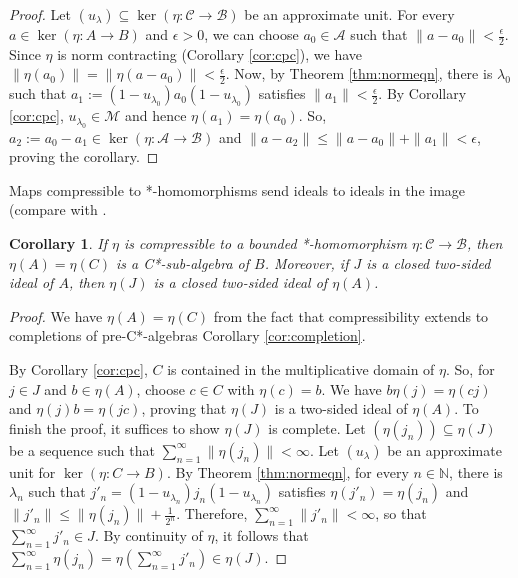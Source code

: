 \documentclass[a4paper, 12pt]{amsart}
\newtheorem{cor}[thm]{Corollary}
\theoremstyle{definition}
\theoremstyle{remark}
\numberwithin{equation}{section}
\begin{document}
\begin{proof}
    Let $(u_{\lambda})\subseteq \ker(\eta:\mathcal{C}\to\mathcal{B})$ be an approximate unit. For every $a\in \ker(\eta:A\to B)$ and $\epsilon > 0$, we can choose $a_{0}\in\mathcal{A}$ such that $\|a - a_{0}\| < \frac{\epsilon}{2}$. Since $\eta$ is norm contracting (Corollary \ref{cor:cpc}), we have $\|\eta(a_{0})\| = \|\eta(a - a_{0})\| < \frac{\epsilon}{2}$. Now, by Theorem \ref{thm:normeqn}, there is $\lambda_{0}$ such that $a_{1}:= (1-u_{\lambda_{0}})a_{0}(1-u_{\lambda_{0}})$ satisfies $\|a_{1}\| < \frac{\epsilon}{2}$. By Corollary \ref{cor:cpc}, $u_{\lambda_{0}}\in \mathcal{M}$ and hence $\eta(a_{1}) = \eta(a_{0})$. So, $a_{2}:= a_{0} - a_{1}\in \ker(\eta: \mathcal{A}\to \mathcal{B})$ and $\|a - a_{2}\|\leq \|a - a_{0}\| + \|a_{1}\| < \epsilon$, proving the corollary.
\end{proof}

Maps compressible to *-homomorphisms send ideals to ideals in the image (compare with \cite[Lemma~2.1]{CN24}.

\begin{cor}
\label{cor:imidealisideal}
    If $\eta$ is compressible to a bounded *-homomorphism $\eta:\mathcal{C}\to\mathcal{B}$, then $\eta(A) = \eta(C)$ is a C*-sub-algebra of $B$. Moreover, if $J$ is a closed two-sided ideal of $A$, then $\eta(J)$ is a closed two-sided ideal of $\eta(A)$.
\end{cor}

\begin{proof}
    We have $\eta(A) = \eta(C)$ from the fact that compressibility extends to completions of pre-C*-algebras Corollary \ref{cor:completion}.

    By Corollary \ref{cor:cpc}, $C$ is contained in the multiplicative domain of $\eta$. So, for $j\in J$ and $b\in \eta(A)$, choose $c\in C$ with $\eta(c) = b$. We have $b\eta(j) = \eta(cj)$ and $\eta(j)b = \eta(jc)$, proving that $\eta(J)$ is a two-sided ideal of $\eta(A)$. To finish the proof, it suffices to show $\eta(J)$ is complete. Let $(\eta(j_{n}))\subseteq \eta(J)$ be a sequence such that $\sum^{\infty}_{n=1}\|\eta(j_{n})\| < \infty$. Let $(u_{\lambda})$ be an approximate unit for $\ker(\eta:C\to B)$. By Theorem \ref{thm:normeqn}, for every $n\in\mathbb{N}$, there is $\lambda_{n}$ such that $j'_{n} = (1-u_{\lambda_{n}})j_{n}(1-u_{\lambda_{n}})$ satisfies $\eta(j'_{n}) = \eta(j_{n})$ and $\|j'_{n}\|\leq \|\eta(j_{n})\| + \frac{1}{2^{n}}$. Therefore, $\sum^{\infty}_{n=1} \|j'_{n}\| < \infty$, so that $\sum^{\infty}_{n=1}j'_{n}\in J$. By continuity of $\eta$, it follows that $\sum_{n=1}^{\infty}\eta(j_{n}) = \eta(\sum^{\infty}_{n=1}j'_{n})\in \eta(J)$.
\end{proof}
\end{document}
